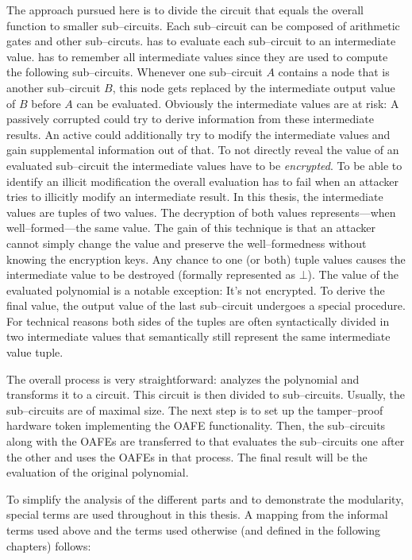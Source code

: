 The approach pursued here is to divide the circuit that equals the overall
function to smaller sub--circuits. Each sub--circuit can be composed of
arithmetic gates and other sub--circuts. \JWpTwo{} has to evaluate each
sub--circuit to an intermediate value. \JWpTwo{} has to remember all
intermediate values since they are used to compute the following sub--circuits.
Whenever one sub--circuit $A$ contains a node that is another sub--circuit $B$,
this node gets replaced by the intermediate output value of $B$ before $A$ can
be evaluated. Obviously the intermediate values are at risk: A passively
corrupted \JWpTwo{} could try to derive information from these intermediate
results. An active \JWpTwo{} could additionally try to modify the intermediate
values and gain supplemental information out of that. To not directly reveal the
value of an evaluated sub--circuit the intermediate values have to be
\emph{encrypted}. To be able to identify an illicit modification the overall
evaluation has to fail when an attacker tries to illicitly modify an
intermediate result. In this thesis, the intermediate values are tuples of two
values. The decryption of both values represents---when well--formed---the same
value. The gain of this technique is that an attacker cannot simply change the
value and preserve the well--formedness without knowing the encryption keys. Any
chance to one (or both) tuple values causes the intermediate value to be
destroyed (formally represented as $\bot$). The value of the evaluated
polynomial is a notable exception: It's not encrypted. To derive the final
value, the output value of the last sub--circuit undergoes a special procedure.
For technical reasons both sides of the tuples are often syntactically divided
in two intermediate values that semantically still represent the same
intermediate value tuple.

The overall process is very straightforward: \JWpOne{} analyzes the polynomial
and transforms it to a circuit. This circuit is then divided to sub--circuits.
Usually, the sub--circuits are of maximal size. The next step is to set up the
tamper--proof hardware token implementing the OAFE functionality. Then, the
sub--circuits along with the OAFEs are transferred to \JWpTwo{} that evaluates
the sub--circuits one after the other and uses the OAFEs in that process. The
final result will be the evaluation of the original polynomial.

To simplify the analysis of the different parts and to demonstrate the
modularity, special terms are used throughout in this thesis. A mapping from the
informal terms used above and the terms used otherwise (and defined in the
following chapters) follows:

